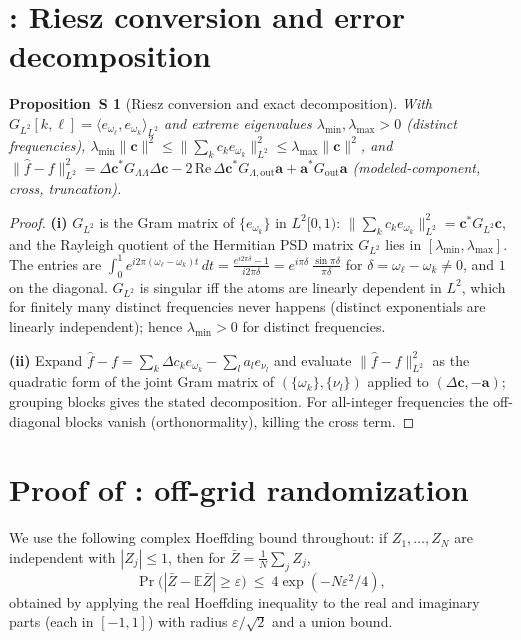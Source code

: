 \documentclass[10pt]{article}
\newtheorem{proposition}{Proposition~S}
\newcommand{\Lam}{\Lambda}
\newcommand{\norm}[1]{\lVert#1\rVert}
\begin{document}
\section{\SPropDecomp: Riesz conversion and error decomposition}\label{sup:decomp}
\begin{proposition}[Riesz conversion and exact decomposition]\label{prop:decomp}
With $G_{L^2}[k,\ell]=\langle e_{\omega_\ell},e_{\omega_k}\rangle_{L^2}$ and extreme
eigenvalues $\lambda_{\min},\lambda_{\max}>0$ (distinct frequencies),
$\lambda_{\min}\norm{\bm c}^2\le\norm{\sum_k c_ke_{\omega_k}}_{L^2}^2\le\lambda_{\max}\norm{\bm c}^2$,
and $\norm{\hat f-f}_{L^2}^2=\Delta\bm c^{*}G_{\Lam\Lam}\Delta\bm c
-2\,\mathrm{Re}\,\Delta\bm c^{*}G_{\Lam,\mathrm{out}}\bm a+\bm a^{*}G_{\mathrm{out}}\bm a$
(modeled-component, cross, truncation).
\end{proposition}
\begin{proof}
\textbf{(i)}  $G_{L^2}$ is the Gram matrix of $\{e_{\omega_k}\}$ in $L^2[0,1)$:
$\norm{\sum_kc_ke_{\omega_k}}_{L^2}^2=\bm c^{*}G_{L^2}\bm c$, and the Rayleigh quotient
of the Hermitian PSD matrix $G_{L^2}$ lies in
$[\lambda_{\min},\lambda_{\max}]$.  The entries are
$\int_0^1e^{i2\pi(\omega_\ell-\omega_k)t}\,dt
=\frac{e^{i2\pi\delta}-1}{i2\pi\delta}=e^{i\pi\delta}\,\frac{\sin\pi\delta}{\pi\delta}$
for $\delta=\omega_\ell-\omega_k\neq0$, and $1$ on the diagonal.  $G_{L^2}$ is singular
iff the atoms are linearly dependent in $L^2$, which for finitely many distinct
frequencies never happens (distinct exponentials are linearly independent); hence
$\lambda_{\min}>0$ for distinct frequencies.

\textbf{(ii)}  Expand
$\hat f-f=\sum_k\Delta c_k e_{\omega_k}-\sum_l a_le_{\nu_l}$ and evaluate
$\norm{\hat f-f}_{L^2}^2$ as the quadratic form of the joint Gram matrix of
$(\{\omega_k\},\{\nu_l\})$ applied to $(\Delta\bm c,-\bm a)$; grouping blocks gives the stated decomposition.  For all-integer frequencies the off-diagonal blocks vanish
(orthonormality), killing the cross term.\end{proof}

\section{Proof of \MThmJitter: off-grid randomization}\label{sup:rand}

We use the following complex Hoeffding bound throughout: if $Z_1,\dots,Z_N$ are
independent with $|Z_j|\le1$, then for $\bar Z=\frac1N\sum_jZ_j$,
\begin{equation}\label{eq:hoeffding}
\Pr\big(|\bar Z-\mathbb E\bar Z|\ge\varepsilon\big)\ \le\
4\exp(-N\varepsilon^2/4),
\end{equation}
obtained by applying the real Hoeffding inequality to the real and imaginary parts
(each in $[-1,1]$) with radius $\varepsilon/\sqrt2$ and a union bound.
\end{document}
